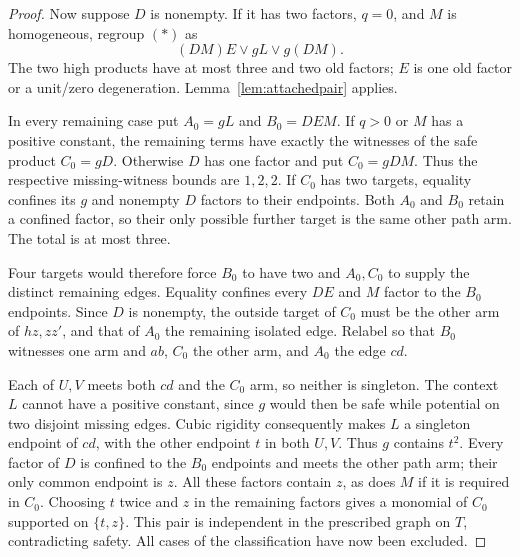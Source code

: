\documentclass[11pt]{article}
\theoremstyle{definition}
\theoremstyle{remark}
\begin{document}
\begin{proof}
Now suppose $D$ is nonempty. If it has two factors, $q=0$, and $M$ is homogeneous, regroup $(\ast)$ as
\[
 (DM)E\vee gL\vee g(DM).
\]
The two high products have at most three and two old factors; $E$ is one old factor or a unit/zero degeneration. Lemma~\ref{lem:attachedpair} applies.

In every remaining case put $A_0=gL$ and $B_0=DEM$. If $q>0$ or $M$ has a positive constant, the remaining terms have exactly the witnesses of the safe product $C_0=gD$. Otherwise $D$ has one factor and put $C_0=gDM$. Thus the respective missing-witness bounds are $1,2,2$. If $C_0$ has two targets, equality confines its $g$ and nonempty $D$ factors to their endpoints. Both $A_0$ and $B_0$ retain a confined factor, so their only possible further target is the same other path arm. The total is at most three.

Four targets would therefore force $B_0$ to have two and $A_0,C_0$ to supply the distinct remaining edges. Equality confines every $DE$ and $M$ factor to the $B_0$ endpoints. Since $D$ is nonempty, the outside target of $C_0$ must be the other arm of $hz,zz'$, and that of $A_0$ the remaining isolated edge. Relabel so that $B_0$ witnesses one arm and $ab$, $C_0$ the other arm, and $A_0$ the edge $cd$.

Each of $U,V$ meets both $cd$ and the $C_0$ arm, so neither is singleton. The context $L$ cannot have a positive constant, since $g$ would then be safe while potential on two disjoint missing edges. Cubic rigidity consequently makes $L$ a singleton endpoint of $cd$, with the other endpoint $t$ in both $U,V$. Thus $g$ contains $t^2$. Every factor of $D$ is confined to the $B_0$ endpoints and meets the other path arm; their only common endpoint is $z$. All these factors contain $z$, as does $M$ if it is required in $C_0$. Choosing $t$ twice and $z$ in the remaining factors gives a monomial of $C_0$ supported on $\{t,z\}$. This pair is independent in the prescribed graph on $T$, contradicting safety. All cases of the classification have now been excluded.
\end{proof}
\end{document}
